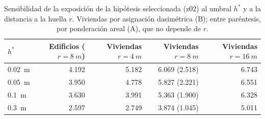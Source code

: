 \begin{table}[htbp]\centering\small
\caption{Sensibilidad de la exposición de la hipótesis seleccionada (z02) al umbral $h^*$ y a la distancia a la huella $r$. Viviendas por asignación dasimétrica (B); entre paréntesis, por ponderación areal (A), que no depende de $r$.}\label{tab:sensibilidad}
\begin{tabular}{lrrrr}\toprule
$h^*$ & Edificios ($r=\SI{8}{m}$) & Viviendas $r=\SI{4}{m}$ & Viviendas $r=\SI{8}{m}$ & Viviendas $r=\SI{16}{m}$\\\midrule
\SI{0,02}{m} & 4.192 & 5.182 & 6.069 (2.518) & 6.743\\
\SI{0,05}{m} & 3.950 & 4.778 & 5.827 (2.221) & 6.551\\
\SI{0,1}{m} & 3.630 & 3.991 & 5.363 (1.900) & 6.328\\
\SI{0,3}{m} & 2.597 & 2.749 & 3.874 (1.045) & 5.011\\
\bottomrule\end{tabular}\end{table}
